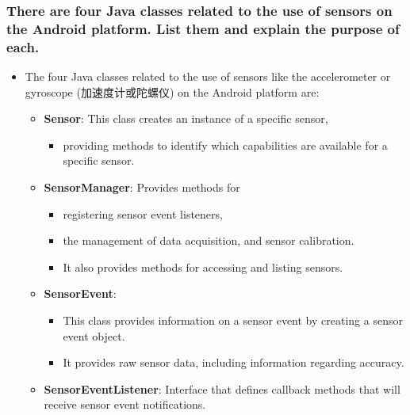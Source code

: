 \documentclass[9pt, b5paper]{article}
\begin{document}
\subsubsection{There are four Java classes related to the use of sensors on the Android platform. List them and explain the purpose of each.}
\label{sec-1-5-1}
\begin{itemize}
\item The four Java classes related to the use of sensors like the accelerometer or gyroscope (加速度计或陀螺仪) on the Android platform are:
\begin{itemize}
\item \textbf{Sensor}: This class creates an instance of a specific sensor, 
\begin{itemize}
\item providing methods to identify which capabilities are available for a specific sensor.
\end{itemize}
\item \textbf{SensorManager}: Provides methods for 
\begin{itemize}
\item registering sensor event listeners,
\item the management of data acquisition, and sensor calibration.
\item It also provides methods for accessing and listing sensors.
\end{itemize}
\item \textbf{SensorEvent}: 
\begin{itemize}
\item This class provides information on a sensor event by creating a sensor event object.
\item It provides raw sensor data, including information regarding accuracy.
\end{itemize}
\item \textbf{SensorEventListener}: Interface that defines callback methods that will receive sensor event notifications.
\end{itemize}
\end{itemize}
\end{document}
